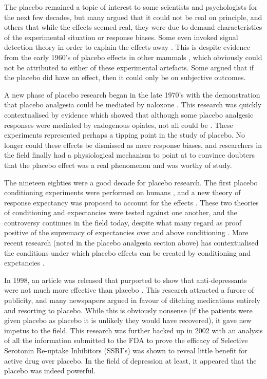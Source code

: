 The placebo remained a topic of interest to some scientists and psychologists for the next few decades, but many argued that it could not be real on principle, and others that while the effects seemed real, they were due to demand characteristics of the experimental situation or response biases. Some even invoked signal detection theory in order to explain the effects away \cite{Allan2002}. This is despite evidence from the early 1960's of placebo effects in other mammals \cite{Herrnstein1962} , which obviously could not be attributed to either of these experimental artefacts. Some argued that if the placebo did have an effect, then it could only be on subjective outcomes.

A new phase of placebo research began in the late 1970's with the demonstration that placebo analgesia could be mediated by naloxone \cite{Levine1978a,Levine1984,Fields1981,Gordon1981,Levine1979}. This research was quickly contextualised by evidence which showed that although some placebo analgesic responses were mediated by endogenous opiates, not all could be \cite{Gracely1983,Levine1984}. These experiments represented perhaps a tipping point in the study of placebo. No longer could these effects be dismissed as mere response biases, and researchers in the field finally had a physiological mechanism to point at to convince doubters that the placebo effect was a real phenomenon and was worthy of study. 

The nineteen eighties were a good decade for placebo research. The first placebo conditioning experiments were performed on humans \cite{Voudouris1985}, and a new theory of response expectancy was proposed to account for the effects \cite{Kirsch1985}. These two theories of conditioning and expectancies were tested against one another, and the controversy continues in the field today, despite what many regard as proof positive of the supremacy of expectancies over and above conditioning \cite{Montgomery1997}. More recent research (noted in the placebo analgesia section above) has contextualised the conditions under which placebo effects can be created by conditioning and expctancies \cite{Benedetti2003a}. 

In 1998, an article was released that purported to show that anti-depressants were not much more effective than placebo \cite{Kirsch1998}. This research attracted a furore of publicity, and many newspapers argued in favour of ditching medications entirely and resorting to placebo. While this is obviously nonsense (if the patients were given placebo as placebo it is unlikely they would have recovered), it gave new impetus to the field. This research was further backed up in 2002 \cite{Kirsch2002a}  with an analysis of all the information submitted to the FDA to prove the efficacy of Selective Serotonin Re-uptake Inhibitors (SSRI's) was shown to reveal little benefit for active drug over placebo. In the field of depression at least, it appeared that the placebo was indeed powerful. 

